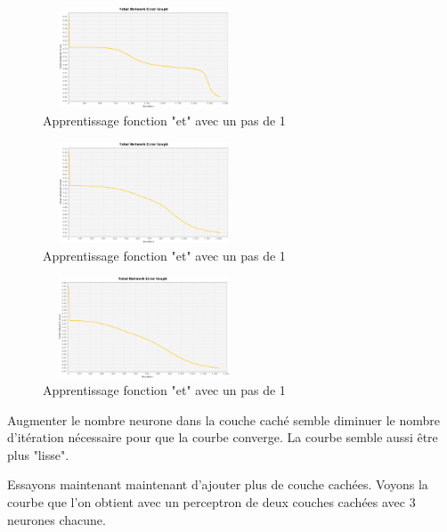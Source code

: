 \documentclass[twoside,openright,a4paper,11pt,french]{article}
\begin{document}
\begin{figure}[ht]
\centering
\includegraphics[width=6cm,height=3cm]{./pics/eq/multi-5_eq_def.eps}
\caption{Apprentissage fonction "et" avec un pas de 1}
\end{figure}

\begin{figure}[ht]
\centering
\includegraphics[width=6cm,height=3cm]{./pics/eq/multi-10_eq_def.eps}
\caption{Apprentissage fonction "et" avec un pas de 1}
\end{figure}

\begin{figure}[ht]
\centering
\includegraphics[width=6cm,height=3cm]{./pics/eq/multi-20_eq_def.eps}
\caption{Apprentissage fonction "et" avec un pas de 1}
\end{figure}


Augmenter le nombre neurone dans la couche caché semble diminuer le nombre
d'itération nécessaire pour que la courbe converge.
La courbe semble aussi être plus "lisse".

Essayons maintenant maintenant d'ajouter plus de couche cachées. Voyons la
courbe que l'on obtient avec un perceptron de deux couches cachées avec 3 
neurones chacune.
\end{document}
